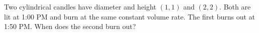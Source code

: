 Two cylindrical candles have diameter and height $(1,1)$ and $(2,2)$. Both are lit at 1:00 PM and burn at the same constant volume rate. The first burns out at 1:50 PM. When does the second burn out?
